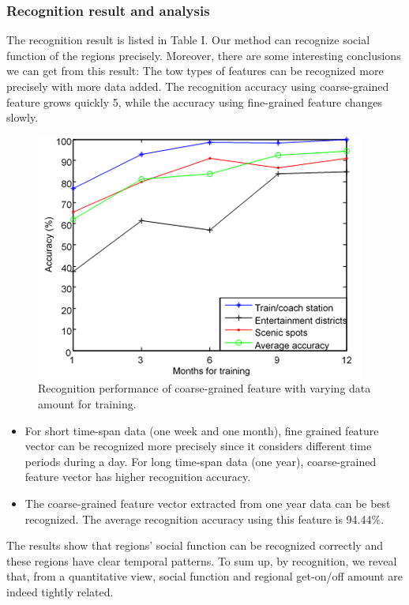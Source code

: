 \documentclass[a4paper, 10pt, conference]{ieeeconf}      %
\begin{document}
\subsubsection{ Recognition result and analysis}The recognition result is listed in Table I. Our method can recognize social function of the regions precisely. Moreover, there are some interesting conclusions we can get from this result: The tow types of features can be recognized more precisely with more data added. The recognition accuracy using coarse-grained feature grows quickly 5, while the accuracy using fine-grained feature changes slowly.

\begin{figure}[htbp]
    \centering
    \includegraphics{fig/f7.png}
    \caption{Recognition performance of coarse-grained feature with varying data amount for training.}
    \label{fig:my_label_5}
\end{figure}

\begin{itemize}
\item For short time-span data (one week and one month), fine grained feature vector can be recognized more precisely since it considers different time periods during a day. For long time-span data (one year), coarse-grained feature vector has higher recognition accuracy.
\item The coarse-grained feature vector extracted from one year data can be best recognized. The average recognition accuracy using this feature is 94.44\%.

\end{itemize}

The results show that regions’ social function can be recognized correctly and these regions have clear temporal patterns. To sum up, by recognition, we reveal that, from a quantitative view, social function and regional get-on/off amount are indeed tightly related.
\end{document}
